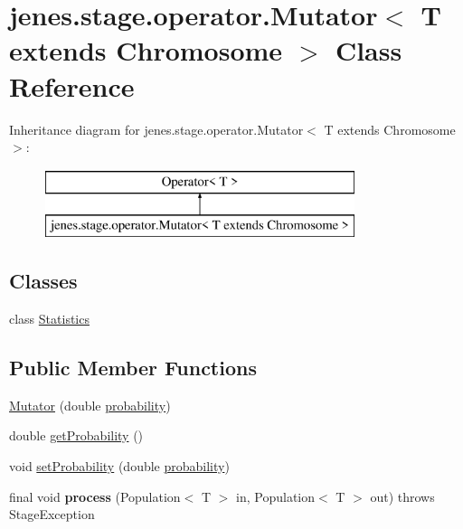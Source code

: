 \hypertarget{classjenes_1_1stage_1_1operator_1_1_mutator_3_01_t_01extends_01_chromosome_01_4}{\section{jenes.\-stage.\-operator.\-Mutator$<$ T extends Chromosome $>$ Class Reference}
\label{classjenes_1_1stage_1_1operator_1_1_mutator_3_01_t_01extends_01_chromosome_01_4}
}
Inheritance diagram for jenes.\-stage.\-operator.\-Mutator$<$ T extends Chromosome $>$\-:\begin{figure}[H]
\begin{center}
\leavevmode
\includegraphics[height=2.000000cm]{classjenes_1_1stage_1_1operator_1_1_mutator_3_01_t_01extends_01_chromosome_01_4}
\end{center}
\end{figure}
\subsection*{Classes}
\begin{DoxyCompactItemize}
\item 
class \hyperlink{classjenes_1_1stage_1_1operator_1_1_mutator_3_01_t_01extends_01_chromosome_01_4_1_1_statistics}{Statistics}
\end{DoxyCompactItemize}
\subsection*{Public Member Functions}
\begin{DoxyCompactItemize}
\item 
\hyperlink{classjenes_1_1stage_1_1operator_1_1_mutator_3_01_t_01extends_01_chromosome_01_4_a01aea5c94d65f99cca8a24be7250a06a}{Mutator} (double \hyperlink{classjenes_1_1stage_1_1operator_1_1_mutator_3_01_t_01extends_01_chromosome_01_4_a60f38eb7afd1ad6a7d1c0c639df2d5fe}{probability})
\item 
double \hyperlink{classjenes_1_1stage_1_1operator_1_1_mutator_3_01_t_01extends_01_chromosome_01_4_af8cd41f87d99e8bc5d00bf9a21ffcd86}{get\-Probability} ()
\item 
void \hyperlink{classjenes_1_1stage_1_1operator_1_1_mutator_3_01_t_01extends_01_chromosome_01_4_a49b8a34032a575badd2080d6c90397cb}{set\-Probability} (double \hyperlink{classjenes_1_1stage_1_1operator_1_1_mutator_3_01_t_01extends_01_chromosome_01_4_a60f38eb7afd1ad6a7d1c0c639df2d5fe}{probability})
\item 
\hypertarget{classjenes_1_1stage_1_1operator_1_1_mutator_3_01_t_01extends_01_chromosome_01_4_a091269db32219198b26860ee4b295345}{final void {\bfseries process} (Population$<$ T $>$ in, Population$<$ T $>$ out)  throws Stage\-Exception }\label{classjenes_1_1stage_1_1operator_1_1_mutator_3_01_t_01extends_01_chromosome_01_4_a091269db32219198b26860ee4b295345}

\end{DoxyCompactItemize}
